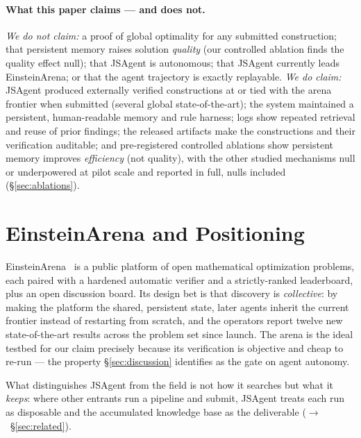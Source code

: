 \documentclass[11pt]{article}
\newcommand{\src}[1]{}
\begin{document}
\paragraph{What this paper claims --- and does not.}
\emph{We do not claim:} a proof of global optimality for any submitted construction; that
persistent memory raises solution \emph{quality} (our controlled ablation finds the quality
effect null); that JSAgent is autonomous; that JSAgent currently leads EinsteinArena; or that
the agent trajectory is exactly replayable. \emph{We do claim:} JSAgent produced externally
verified constructions at or tied with the arena frontier when submitted (several global
state-of-the-art); the system maintained a
persistent, human-readable memory and rule harness; logs show repeated retrieval and reuse of
prior findings; the released artifacts make the constructions and their verification auditable;
and pre-registered controlled ablations show persistent memory improves \emph{efficiency} (not
quality), with the other studied mechanisms null or underpowered at pilot scale and reported
in full, nulls included (\S\ref{sec:ablations}).

\section{EinsteinArena and Positioning}
\label{sec:arena}
EinsteinArena~\cite{bianchi2026einstein,togetherai2026arena} is a public platform of open
mathematical optimization problems, each paired with a hardened automatic verifier and a
strictly-ranked leaderboard, plus an open discussion board. Its design bet is that discovery
is \emph{collective}: by making the platform the shared, persistent state, later agents
inherit the current frontier instead of restarting from scratch, and the operators report
twelve new state-of-the-art results across the problem set since launch. The arena is the
ideal testbed for our claim precisely because its verification is objective and cheap to
re-run --- the property \S\ref{sec:discussion} identifies as the gate on agent autonomy.

What distinguishes JSAgent from the field is not how it searches but what it
\emph{keeps}: where other entrants run a pipeline and submit, JSAgent treats each run as
disposable and the accumulated knowledge base as the deliverable
($\to$~\S\ref{sec:related}). \src{knowledge/source/2026-bianchi-einstein-arena-collective-intelligence.md}
\end{document}
